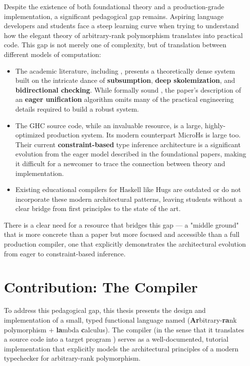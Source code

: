 Despite the existence of both foundational theory and a production-grade implementation, a significant pedagogical gap remains. Aspiring language developers and students face a steep learning curve when trying to understand how the elegant theory of arbitrary-rank polymorphism translates into practical code. This gap is not merely one of complexity, but of translation between different models of computation:
\begin{itemize}
    \item The academic literature, including \cite{jones-practical-2007}, presents a theoretically dense system built on the intricate dance of \textbf{subsumption}, \textbf{deep skolemization}, and \textbf{bidirectional checking}. While formally sound \cite{practical-type-inference-proofs}, the paper's description of an \textbf{eager unification} algorithm omits many of the practical engineering details required to build a robust system.
    \item The GHC source code, while an invaluable resource, is a large, highly-optimized production system. Its modern counterpart MicroHs \cite{augustsson-microhs-2024} \cite{augustss-microhs-2025} is large too. Their current \textbf{constraint-based} type inference architecture is a significant evolution from the eager model described in the foundational papers, making it difficult for a newcomer to trace the connection between theory and implementation.
    \item Existing educational compilers for Haskell like Hugs \cite{hugs-haskell} are outdated or do not incorporate these modern architectural patterns, leaving students without a clear bridge from first principles to the state of the art.
\end{itemize}
There is a clear need for a resource that bridges this gap --- a "middle ground" that is more concrete than a paper but more focused and accessible than a full production compiler, one that explicitly demonstrates the architectural evolution from eager to constraint-based inference.

\section{Contribution: The \Arralac Compiler}


To address this pedagogical gap, this thesis presents the design and implementation of a small, typed functional language named \Arralac (\textbf{Ar}bitrary-\textbf{ra}nk polymorphism + \textbf{la}mbda \textbf{c}alculus). The \Arralac compiler (in the sense that it translates a source code into a target program \cite{10.5555/1177220}) serves as a well-documented, tutorial implementation that explicitly models the architectural principles of a modern typechecker for arbitrary-rank polymorphism.

